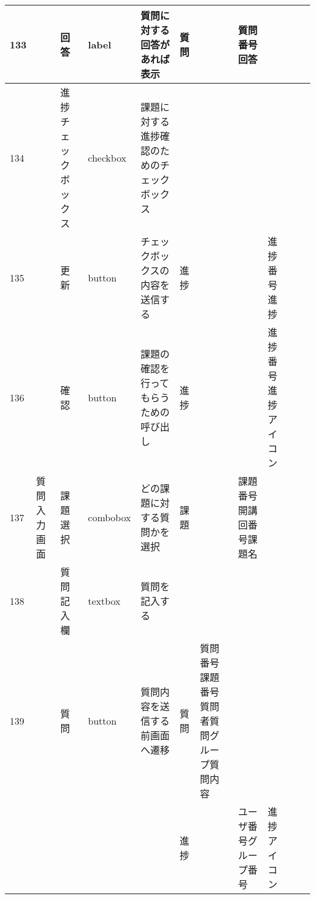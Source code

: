 \begin{landscape}
\begin{table}[]
\begin{tabular}{|l|l|l|l|l|l|l|l|l|l|l|}
133 &               & 回答               & label    & 質問に対する回答があれば表示                                                    & 質問      &                       & 質問番号回答             &                 &                               &                                                                \\ \hline
134 &               & 進捗チェックボックス       & checkbox & 課題に対する進捗確認のためのチェックボックス                                            &         &                       &                    &                 &                               &                                                                \\ \hline
135 &               & 更新               & button   & チェックボックスの内容を送信する                                                  & 進捗      &                       &                    & 進捗番号進捗          &                               &                                                                \\ \hline
136 &               & 確認               & button   & 課題の確認を行ってもらうための呼び出し                                               & 進捗      &                       &                    & 進捗番号進捗アイコン      &                               &                                                                \\ \hline
137 & 質問入力画面        & 課題選択             & combobox & どの課題に対する質問かを選択                                                    & 課題      &                       & 課題番号開講回番号課題名       &                 &                               &                                                                \\ \hline
138 &               & 質問記入欄            & textbox  & 質問を記入する                                                           &         &                       &                    &                 &                               &                                                                \\ \hline
139 &               & 質問               & button   & 質問内容を送信する前画面へ遷移                                                   & 質問      & 質問番号課題番号質問者質問グループ質問内容 &                    &                 &                               &                                                                \\ \hline
    &               &                  &          &                                                                   & 進捗      &                       & ユーザ番号グループ番号        & 進捗アイコン          &                               &                                                                \\ \hline

\end{tabular}
\end{table}
\end{landscape}
